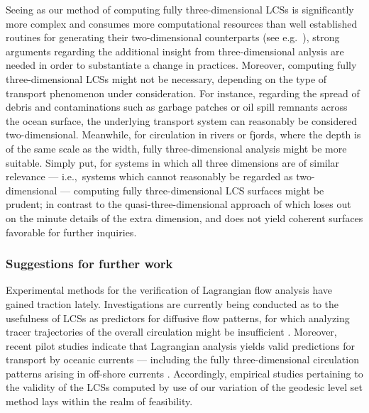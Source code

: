 Seeing as our method of computing fully three-dimensional LCSs is significantly
more complex and consumes more computational resources than well established
routines for generating their two-dimensional counterparts (see e.g.\
\textcite{onu2015lcstool}), strong arguments regarding the additional insight
from three-dimensional anlysis are needed in order to substantiate a change in
practices. Moreover, computing fully three-dimensional LCSs might not be
necessary, depending on the type of transport phenomenon under consideration.
For instance, regarding the spread of debris and contaminations such as garbage
patches or oil spill remnants across the ocean surface, the underlying
transport system can reasonably be considered two-dimensional. Meanwhile, for
circulation in rivers or fjords, where the depth is of the same scale as the
width, fully three-dimensional analysis might be more suitable. Simply put, for
systems in which all three dimensions are of similar relevance --- i.e.,\
systems which cannot reasonably be regarded as two-dimensional --- computing
fully three-dimensional LCS surfaces might be prudent; in contrast to the
quasi-three-dimensional approach of \textcite{oettinger2016autonomous} which
loses out on the minute details of the extra dimension, and does not yield
coherent surfaces favorable for further inquiries.

\subsubsection{Suggestions for further work}
\label{ssub:suggestions_for_further_work}

Experimental methods for the verification of Lagrangian flow analysis have
gained traction lately. Investigations are currently being conducted as to the
usefulness of LCSs as predictors for diffusive flow patterns, for which
analyzing tracer trajectories of the overall circulation might be insufficient
\parencite{haller2018material}. Moreover, recent pilot studies indicate that
Lagrangian analysis yields valid predictions for transport by oceanic currents
\parencite{filippi2018detection} --- including the fully three-dimensional
circulation patterns arising in off-shore currents
\parencite{peacock2018targeted}. Accordingly, empirical studies pertaining to
the validity of the LCSs computed by use of our variation of the geodesic level
set method lays within the realm of feasibility.

